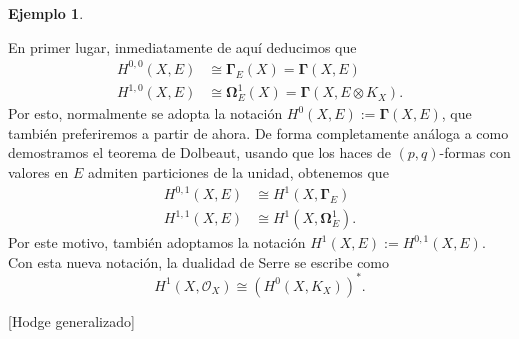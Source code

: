\documentclass[12pt,a4paper]{article}
\theoremstyle{definition} \newtheorem{defn}[thm]{Definición}
\theoremstyle{definition} \newtheorem{ejemplo}[thm]{Ejemplo}
\theoremstyle{definition} \newtheorem{ejercicio}[thm]{Ejercicio}
\def\OO{\mathscr{O}}
\begin{document}
\begin{ejemplo}
 \begin{center}      \end{center}
En primer lugar, inmediatamente de aquí deducimos que
\begin{align*}
  H^{0,0}(X,E) & \cong \boldsymbol{\Gamma}_E(X) = \boldsymbol{\Gamma}(X,E) \\
  H^{1,0}(X,E) & \cong \boldsymbol{\Omega}^1_E(X) = \boldsymbol{\Gamma}(X,E\otimes K_X).
\end{align*}
Por esto, normalmente se adopta la notación $H^0(X,E) := \boldsymbol{\Gamma}(X,E)$, que también preferiremos a partir de ahora.
De forma completamente análoga a como demostramos el teorema de Dolbeaut, usando que los haces de $(p,q)$-formas con valores en $E$ admiten particiones de la unidad, obtenemos que 
\begin{align*}
  H^{0,1}(X,E) & \cong H^1(X,\boldsymbol{\Gamma}_E) \\
  H^{1,1}(X,E) & \cong H^1(X,\boldsymbol{\Omega}^1_E).
\end{align*}
Por este motivo, también adoptamos la notación $H^1(X,E):=H^{0,1}(X,E)$. 
Con esta nueva notación, la dualidad de Serre se escribe como
\begin{equation*}
  H^1(X,\OO_X) \cong (H^0(X,K_X))^*.
\end{equation*}

[Hodge generalizado]

  
\end{ejemplo}
\end{document}
